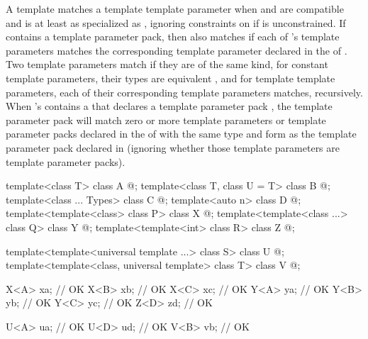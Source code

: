 \documentclass{wg21}
\begin{document}
\ednote{[...]}

\pnum
A template   matches a template
template parameter  when
 and  are compatible and
 is at least as specialized as , ignoring constraints
on  if  is unconstrained.
If  contains a template parameter pack, then  also matches 
if each of 's template parameters
matches the corresponding template parameter declared in the
 of .
Two template parameters match if they are of the same kind,
for constant template parameters, their types are
equivalent , and for template template parameters,
each of their corresponding template parameters matches, recursively.
When 's  contains a 
that declares a template parameter
pack , the template parameter pack will match zero or more template
parameters or template parameter packs declared in the  of
 with the same type and form as the template parameter pack declared in 
(ignoring whether those template parameters are template parameter packs).


\begin{example}
\begin{codeblock}
    template<class T> class A { @\commentellip@ };
    template<class T, class U = T> class B { @\commentellip@ };
    template<class ... Types> class C { @\commentellip@ };
    template<auto n> class D { @\commentellip@ };
    template<template<class> class P> class X { @\commentellip@ };
    template<template<class ...> class Q> class Y { @\commentellip@ };
    template<template<int> class R> class Z { @\commentellip@ };
\end{codeblock}
\begin{addedblock}
\begin{codeblock}
    template<template<universal template ...> class S> class U { @\commentellip@ };
    template<template<class, universal template> class T> class V { @\commentellip@ };
\end{codeblock}
\end{addedblock}
\begin{codeblock}
    X<A> xa;            // OK
    X<B> xb;            // OK
    X<C> xc;            // OK
    Y<A> ya;            // OK
    Y<B> yb;            // OK
    Y<C> yc;            // OK
    Z<D> zd;            // OK
\end{codeblock}
\begin{addedblock}
\begin{codeblock}
    U<A> ua;            // OK
    U<D> ud;            // OK
    V<B> vb;            // OK
\end{codeblock}
\end{addedblock}
\end{example}
\end{document}
